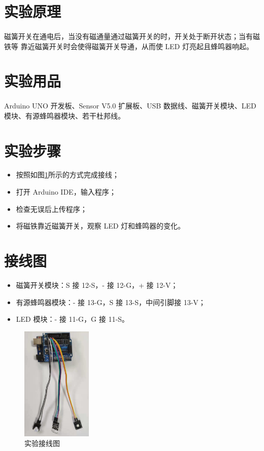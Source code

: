 \documentclass[UTF8, oneside]{ctexbook}
\begin{document}
\section{实验原理}
\paragraph{}
磁簧开关在通电后，当没有磁通量通过磁簧开关的时，开关处于断开状态；当有磁铁等
靠近磁簧开关时会使得磁簧开关导通，从而使 LED 灯亮起且蜂鸣器响起。

\section{实验用品}
\paragraph{}
Arduino UNO 开发板、Sensor V5.0 扩展板、USB 数据线、磁簧开关模块、LED 模块、有源蜂鸣器模块、若干杜邦线。

\section{实验步骤}
\begin{itemize}
    \item[(1)] 按照如图\ref{s20_line}所示的方式完成接线；
    \item[(2)] 打开 Arduino IDE，输入程序；
    \item[(3)] 检查无误后上传程序；
    \item[(4)] 将磁铁靠近磁簧开关，观察 LED 灯和蜂鸣器的变化。
\end{itemize}

\section{接线图}
\begin{itemize}
    \item 磁簧开关模块：S 接 12-S，- 接 12-G，+ 接 12-V；
    \item 有源蜂鸣器模块：- 接 13-G，S 接 13-S，中间引脚接 13-V；
    \item LED 模块：- 接 11-G，G 接 11-S。
\end{itemize}
\begin{figure}[h]
    \centering
    \includegraphics[width=0.3\textwidth]{./result/sensor/20/lines2.png}
    \caption{实验接线图}
    \label{s20_line}
\end{figure}
\end{document}
